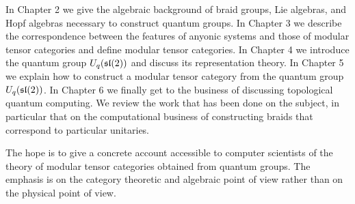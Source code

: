 In Chapter 2 we give the algebraic background of braid groups, Lie algebras,
and Hopf algebras necessary to construct quantum groups. In Chapter 3 we describe the
correspondence between the features of anyonic systems and those of modular
tensor categories and define modular tensor categories.  In
Chapter 4 we introduce the quantum group $U_q(\mathfrak{sl}(2))$ and discuss its
representation theory. In
Chapter 5 we explain how to construct a modular tensor category from the
quantum group $U_q(\mathfrak{sl}(2))$. In Chapter 6 we finally get to the business of
discussing topological quantum computing. We review the work that has been done
on the subject, in particular that on the computational business of
constructing braids that correspond to particular unitaries. 

The hope is to give a concrete account accessible to computer scientists of the
theory of modular tensor categories obtained from quantum groups. The
emphasis is on the category theoretic and algebraic point of view rather than
on the physical point of view. 

